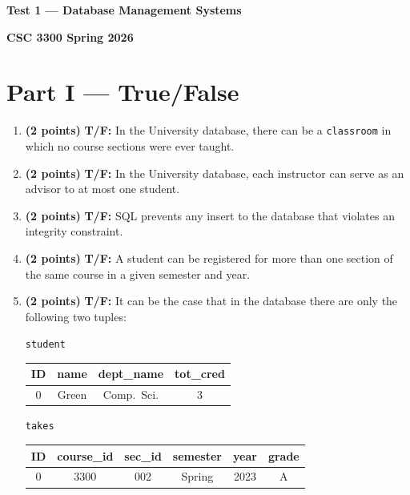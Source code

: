 \documentclass{article}
\begin{document}
\begin{center}
\textbf{\Large Test 1 — Database Management Systems}

\textbf{CSC 3300 \quad Spring 2026}
\end{center}

\section*{Part I — True/False}
\begin{enumerate}
  \item \textbf{(2 points)} \textbf{T/F:} In the University database, there can be a \texttt{classroom} in which no course sections were ever taught.
  \item \textbf{(2 points)} \textbf{T/F:} In the University database, each instructor can serve as an advisor to at most one student.
  \item \textbf{(2 points)} \textbf{T/F:} SQL prevents any insert to the database that violates an integrity constraint.
  \item \textbf{(2 points)} \textbf{T/F:} A student can be registered for more than one section of the same course in a given semester and year.
  \item \textbf{(2 points)} \textbf{T/F:} It can be the case that in the database there are only the following two tuples:

  \medskip
  \noindent\texttt{student}
  \begin{center}
  \begin{tabular}{|c|c|c|c|}
  \hline
  \textbf{ID} & \textbf{name} & \textbf{dept\_name} & \textbf{tot\_cred} \\\hline
  0 & Green & Comp.\ Sci. & 3 \\\hline
  \end{tabular}
  \end{center}

  \noindent\texttt{takes}
  \begin{center}
  \begin{tabular}{|c|c|c|c|c|c|}
  \hline
  \textbf{ID} & \textbf{course\_id} & \textbf{sec\_id} & \textbf{semester} & \textbf{year} & \textbf{grade} \\\hline
  0 & 3300 & 002 & Spring & 2023 & A \\\hline
  \end{tabular}
  \end{center}


\end{enumerate}
\end{document}
